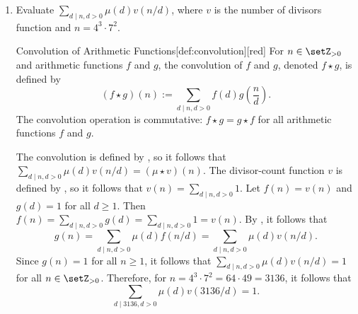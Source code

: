 \begin{enumerate}
  
  \newpage
  \item Evaluate $\sum_{d \mid n, d>0} \mu(d) v(n / d)$, where $v$ is the 
  number of divisors function and $n=4^{3} \cdot 7^{2}$.
  \begin{define}{Convolution of Arithmetic Functions}[def:convolution][red]
    For $n\in\setZ_{>0}$ and arithmetic functions $f$ and $g$, the convolution of $f$ and $g$, denoted $f \star g$, is defined by
    \[
    (f \star g)(n):=\sum_{d \mid n, d>0} f(d) g\left(\frac{n}{d}\right).
    \]
    The convolution operation is commutative: $f \star g = g \star f$ for all arithmetic functions $f$ and $g$.
  \end{define}
  \begin{subanswer}
    The convolution is defined by , so it follows that $\sum_{d \mid n, d>0} \mu(d) v(n/d) = (\mu \star v)(n)$.
    The divisor-count function $v$ is defined by , so it follows that $v(n) = \sum_{d \mid n, d>0} 1$.
    Let $f(n) = v(n)$ and $g(d) = 1$ for all $d \geq 1$. Then $f(n) = \sum_{d \mid n, d>0} g(d) = \sum_{d \mid n, d>0} 1 = v(n)$.
    By , it follows that
    \[
    g(n) = \sum_{d \mid n, d>0} \mu(d) f(n/d) = \sum_{d \mid n, d>0} \mu(d) v(n/d).
    \]
    Since $g(n) = 1$ for all $n \geq 1$, it follows that $\sum_{d \mid n, d>0} \mu(d) v(n/d) = 1$ for all $n \in \setZ_{>0}$.
    Therefore, for $n = 4^3 \cdot 7^2 = 64 \cdot 49 = 3136$, it follows that
    \[
    \sum_{d \mid 3136, d>0} \mu(d) v(3136/d) = 1.
    \]
  \end{subanswer}




\end{enumerate}
